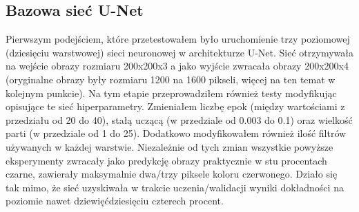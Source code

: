 \documentclass{article}
\begin{document}
\subsection{Bazowa sieć U-Net}
Pierwszym podejściem, które przetestowałem było uruchomienie trzy poziomowej (dziesięciu warstwowej) sieci neuronowej w architekturze U-Net.
Sieć otrzymywała na wejście obrazy rozmiaru 200x200x3 a jako wyjście zwracała obrazy 200x200x4 (oryginalne obrazy były rozmiaru 1200 na 1600 pikseli, więcej na ten temat w kolejnym punkcie).
Na tym etapie przeprowadziłem również testy modyfikując opisujące te sieć hiperparametry.
Zmieniałem liczbę epok (między wartościami z przedziału od 20 do 40), stałą uczącą (w przedziale od 0.003 do 0.1) oraz wielkość parti (w przedziale od 1 do 25).
Dodatkowo modyfikowałem również ilość filtrów używanych w każdej warstwie.
Niezależnie od tych zmian wszystkie powyższe eksperymenty zwracały jako predykcję obrazy praktycznie w stu procentach czarne, zawierały maksymalnie dwa/trzy piksele koloru czerwonego.
Działo się tak mimo, że sieć uzyskiwała w trakcie uczenia/walidacji wyniki dokładności na poziomie nawet dziewięćdziesięciu czterech procent.
\end{document}
